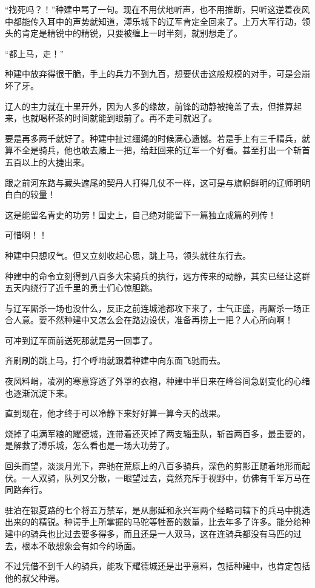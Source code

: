 “找死吗？！”种建中骂了一句。现在不用伏地听声，也不用推断，只听这逆着夜风中都能传入耳中的声势就知道，溥乐城下的辽军肯定全回来了。上万大军行动，领头的肯定是精锐中的精锐，只要被缠上一时半刻，就别想走了。

“都上马，走！”

种建中放弃得很干脆，手上的兵力不到九百，想要伏击这般规模的对手，可是会崩坏了牙。

辽人的主力就在十里开外，因为人多的缘故，前锋的动静被掩盖了去，但推算起来，也就喝杯茶的时间就能到眼前了。再不走可就迟了。

要是再多两千就好了。种建中扯过缰绳的时候满心遗憾。若是手上有三千精兵，就算不全是骑兵，他也敢去赌上一把，给赶回来的辽军一个好看。甚至打出一个斩首五百以上的大捷出来。

跟之前河东路与藏头遮尾的契丹人打得几仗不一样，这可是与旗帜鲜明的辽师明明白白的较量！

这是能留名青史的功劳！国史上，自己绝对能留下一篇独立成篇的列传！

可惜啊！！

种建中只想叹气。但又立刻收起心思，跳上马，领头就往东行去。

种建中的命令立刻得到八百多大宋骑兵的执行，远方传来的动静，其实已经让这群五天内绕行了近千里的勇士们心惊胆跳。

与辽军厮杀一场也没什么，反正之前连城池都攻下来了，士气正盛，再厮杀一场正合人意。要不然种建中又怎么会在路边设伏，准备再捞上一把？人心所向啊！

可冲到辽军面前送死那就是另一回事了。

齐刷刷的跳上马，打个呼哨就跟着种建中向东面飞驰而去。

夜风料峭，凌冽的寒意穿透了外罩的衣袍，种建中半日来在峰谷间急剧变化的心绪也逐渐沉淀下来。

直到现在，他才终于可以冷静下来好好算一算今天的战果。

烧掉了屯满军粮的耀德城，连带着还灭掉了两支辎重队，斩首两百多，最重要的，是解救了溥乐城，怎么看也是一场大功劳了。

回头而望，淡淡月光下，奔驰在荒原上的八百多骑兵，深色的剪影正随着地形而起伏。一人双骑，队列又分散，一眼望过去，竟然充斥于视野中，仿佛有千军万马在同路奔行。

驻泊在银夏路的七个将五万禁军，是从鄜延和永兴军两个经略司辖下的兵马中挑选出来的的精锐。种谔手上所掌握的马驼等牲畜的数量，比去年多了许多。能分给种建中的骑兵也比过去要多得多，而且还是一人双马，这在连骑兵都没有马匹的过去，根本不敢想象会有如今的场面。

不过凭借不到千人的骑兵，能攻下耀德城还是出乎意料，包括种建中，也肯定包括他的叔父种谔。


